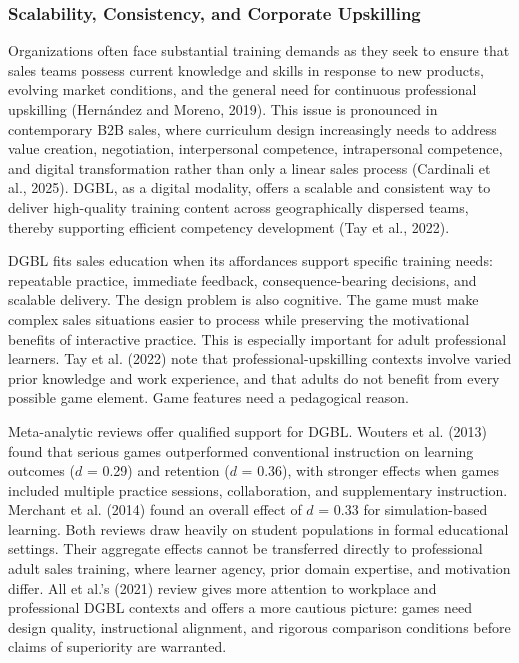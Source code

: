 \documentclass[12pt]{report}
\begin{document}
\subsubsection{Scalability, Consistency, and Corporate Upskilling}
Organizations often face substantial training demands as they seek to ensure that sales teams possess current knowledge and skills in response to new products, evolving market conditions, and the general need for continuous professional upskilling (Hern\'andez and Moreno, 2019). This issue is pronounced in contemporary B2B sales, where curriculum design increasingly needs to address value creation, negotiation, interpersonal competence, intrapersonal competence, and digital transformation rather than only a linear sales process (Cardinali et al., 2025). DGBL, as a digital modality, offers a scalable and consistent way to deliver high-quality training content across geographically dispersed teams, thereby supporting efficient competency development (Tay et al., 2022).

DGBL fits sales education when its affordances support specific training needs: repeatable practice, immediate feedback, consequence-bearing decisions, and scalable delivery. The design problem is also cognitive. The game must make complex sales situations easier to process while preserving the motivational benefits of interactive practice. This is especially important for adult professional learners. Tay et al. (2022) note that professional-upskilling contexts involve varied prior knowledge and work experience, and that adults do not benefit from every possible game element. Game features need a pedagogical reason.

Meta-analytic reviews offer qualified support for DGBL. Wouters et al. (2013) found that serious games outperformed conventional instruction on learning outcomes ($d$ = 0.29) and retention ($d$ = 0.36), with stronger effects when games included multiple practice sessions, collaboration, and supplementary instruction. Merchant et al. (2014) found an overall effect of $d$ = 0.33 for simulation-based learning. Both reviews draw heavily on student populations in formal educational settings. Their aggregate effects cannot be transferred directly to professional adult sales training, where learner agency, prior domain expertise, and motivation differ. All et al.'s (2021) review gives more attention to workplace and professional DGBL contexts and offers a more cautious picture: games need design quality, instructional alignment, and rigorous comparison conditions before claims of superiority are warranted.
\end{document}

